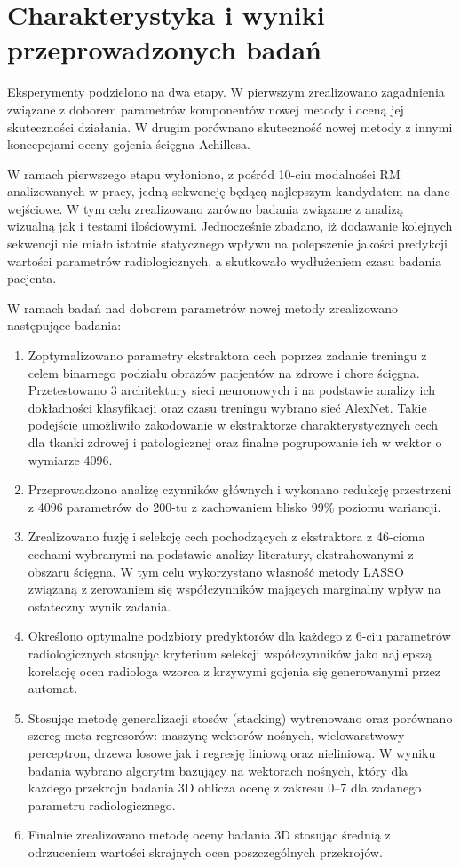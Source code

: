 {\let\clearpage\relax\chapter*{Charakterystyka i wyniki przeprowadzonych badań}}

Eksperymenty podzielono na dwa etapy. W pierwszym zrealizowano zagadnienia związane z doborem parametrów komponentów nowej metody i oceną jej skuteczności działania. W drugim porównano skuteczność nowej metody z innymi koncepcjami oceny gojenia ścięgna Achillesa. 

W ramach pierwszego etapu wyłoniono, z pośród 10-ciu modalności RM analizowanych w pracy, jedną sekwencję będącą najlepszym kandydatem na dane wejściowe. W tym celu zrealizowano zarówno badania związane z analizą wizualną jak i testami ilościowymi. Jednocześnie zbadano, iż dodawanie kolejnych sekwencji nie miało istotnie statycznego wpływu na polepszenie jakości predykcji wartości parametrów radiologicznych, a skutkowało wydłużeniem czasu badania pacjenta. 

W ramach badań nad doborem parametrów nowej metody zrealizowano następujące badania:
\begin{enumerate}
	\item Zoptymalizowano parametry ekstraktora cech poprzez zadanie treningu z celem binarnego podziału obrazów pacjentów na zdrowe i chore ścięgna. Przetestowano 3 architektury sieci neuronowych i na podstawie analizy ich dokładności klasyfikacji oraz czasu treningu wybrano sieć AlexNet. Takie podejście umożliwiło zakodowanie w ekstraktorze charakterystycznych cech dla tkanki zdrowej i patologicznej oraz finalne pogrupowanie ich w wektor o wymiarze 4096.
	\item Przeprowadzono analizę czynników głównych i wykonano redukcję przestrzeni z 4096 parametrów do 200-tu z zachowaniem blisko 99\% poziomu wariancji.
	\item Zrealizowano fuzję i selekcję cech pochodzących z ekstraktora z 46-cioma cechami wybranymi na podstawie analizy literatury, ekstrahowanymi z obszaru ścięgna. W tym celu wykorzystano własność metody LASSO związaną z zerowaniem się współczynników mających marginalny wpływ na ostateczny wynik zadania.
	\item Określono optymalne podzbiory predyktorów dla każdego z 6-ciu parametrów radiologicznych stosując kryterium selekcji współczynników jako najlepszą korelację ocen radiologa wzorca z krzywymi gojenia się generowanymi przez automat.
	\item Stosując metodę generalizacji stosów (stacking) wytrenowano oraz porównano szereg meta-regresorów: maszynę wektorów nośnych, wielowarstwowy perceptron, drzewa losowe jak i regresję liniową oraz nieliniową. W wyniku badania wybrano algorytm bazujący na wektorach nośnych, który dla każdego przekroju badania 3D oblicza ocenę z zakresu 0--7 dla zadanego parametru radiologicznego.
	\item Finalnie zrealizowano metodę oceny badania 3D stosując średnią z odrzuceniem wartości skrajnych ocen poszczególnych przekrojów.
\end{enumerate}

